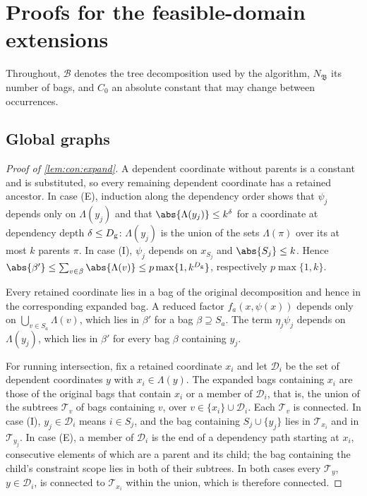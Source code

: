 \section{Proofs for the feasible-domain extensions}\label{app:con}

Throughout, $\mathcal B$ denotes the tree decomposition used by the
algorithm, $N_{\mathfrak B}$ its number of bags, and $C_0$ an absolute
constant that may change between occurrences.

\subsection{Global graphs}\label{app:con:graph}

\begin{proof}[Proof of \cref{lem:con:expand}]
A dependent coordinate without parents is a constant and is substituted, so
every remaining dependent coordinate has a retained ancestor. In case (E),
induction along the dependency order shows that $\psi_j$ depends only on
$\Lambda(y_j)$ and that $\abs{\Lambda(y_j)}\le k^\delta$ for a coordinate at
dependency depth $\delta\le D_{\rm g}$: $\Lambda(y_j)$ is the union of the sets
$\Lambda(\pi)$ over its at most $k$ parents $\pi$. In case (I), $\psi_j$
depends on $x_{S_j}$ and $\abs{S_j}\le k$. Hence
$\abs{\beta'}\le\sum_{v\in\beta}\abs{\Lambda(v)}\le p\max\{1,k^{D_{\rm g}}\}$,
respectively $p\max\{1,k\}$.

Every retained coordinate lies in a bag of the original decomposition and
hence in the corresponding expanded bag. A reduced factor $f_a(x,\psi(x))$
depends only on $\bigcup_{v\in S_a}\Lambda(v)$, which lies in $\beta'$ for a
bag $\beta\supseteq S_a$. The term $\eta_j\psi_j$ depends on $\Lambda(y_j)$,
which lies in $\beta'$ for every bag $\beta$ containing $y_j$.

For running intersection, fix a retained coordinate $x_i$ and let $\mathcal
D_i$ be the set of dependent coordinates $y$ with $x_i\in\Lambda(y)$. The
expanded bags containing $x_i$ are those of the original bags that contain
$x_i$ or a member of $\mathcal D_i$, that is, the union of the subtrees
$\mathcal T_v$ of bags containing $v$, over $v\in\{x_i\}\cup\mathcal D_i$.
Each $\mathcal T_v$ is connected. In case (I), $y_j\in\mathcal D_i$ means
$i\in S_j$, and the bag containing $S_j\cup\{y_j\}$ lies in $\mathcal T_{x_i}$
and in $\mathcal T_{y_j}$. In case (E), a member of $\mathcal D_i$ is the end
of a dependency path starting at $x_i$, consecutive elements of which are a
parent and its child; the bag containing the child's constraint scope lies in
both of their subtrees. In both cases every $\mathcal T_y$, $y\in\mathcal D_i$,
is connected to $\mathcal T_{x_i}$ within the union, which is therefore
connected.
\end{proof}

